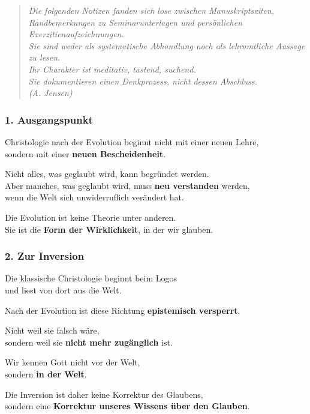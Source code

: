 \documentclass[
]{article}
\begin{document}
\begin{quote}
\emph{Die folgenden Notizen fanden sich lose zwischen Manuskriptseiten, Randbemerkungen zu Seminarunterlagen und persönlichen Exerzitienaufzeichnungen.\\
Sie sind weder als systematische Abhandlung noch als lehramtliche Aussage zu lesen.\\
Ihr Charakter ist meditativ, tastend, suchend.\\
Sie dokumentieren einen Denkprozess, nicht dessen Abschluss.\\
(A. Jensen)}
\end{quote}

\subsubsection{\texorpdfstring{\textbf{1. Ausgangspunkt}}{1. Ausgangspunkt}}\label{ausgangspunkt}

Christologie nach der Evolution beginnt nicht mit einer neuen Lehre,\\
sondern mit einer \textbf{neuen Bescheidenheit}.

Nicht alles, was geglaubt wird, kann begründet werden.\\
Aber manches, was geglaubt wird, muss \textbf{neu verstanden} werden,\\
wenn die Welt sich unwiderruflich verändert hat.

Die Evolution ist keine Theorie unter anderen.\\
Sie ist die \textbf{Form der Wirklichkeit}, in der wir glauben.

\subsubsection{\texorpdfstring{\textbf{2. Zur Inversion}}{2. Zur Inversion}}\label{zur-inversion}

Die klassische Christologie beginnt beim Logos\\
und liest von dort aus die Welt.

Nach der Evolution ist diese Richtung \textbf{epistemisch versperrt}.

Nicht weil sie falsch wäre,\\
sondern weil sie \textbf{nicht mehr zugänglich} ist.

Wir kennen Gott nicht vor der Welt,\\
sondern \textbf{in der Welt}.

Die Inversion ist daher keine Korrektur des Glaubens,\\
sondern eine \textbf{Korrektur unseres Wissens über den Glauben}.
\end{document}
